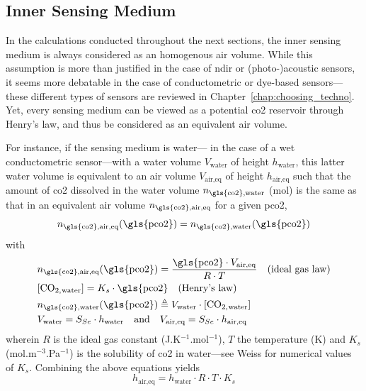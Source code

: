 \subsection{Inner Sensing Medium}\label{sect:tcco2:inner_medium}

In the calculations conducted throughout the next sections, the inner sensing medium is always considered as an homogenous air volume. While this assumption is more than justified in the case of \gls{ndir} or (photo-)acoustic sensors, it seems more debatable in the case of conductometric or dye-based sensors---these different types of sensors are reviewed in Chapter~\ref{chap:choosing_techno}. Yet, every sensing medium can be viewed as a potential \gls{co2} reservoir through Henry's law, and thus be considered as an equivalent air volume.

For instance, if the sensing medium is water---\eg{} in the case of a wet conductometric sensor---with a water volume $V_\text{water}$ of height $h_\text{water}$, this latter water volume is equivalent to an air volume $V_\text{air,eq}$ of height $h_\text{air,eq}$ such that the amount of \gls{co2} dissolved in the water volume $n_\text{\gls{co2},water}$ (mol) is the same as that in an equivalent air volume $n_\text{\gls{co2},air,eq}$ for a given \gls{pco2}, \ie{}
\begin{equation}
	n_\text{\gls{co2},air,eq}(\text{\gls{pco2}}) = n_\text{\gls{co2},water}(\text{\gls{pco2}})
\end{equation}
with
\begin{equation}
	\begin{aligned}
		&n_\text{\gls{co2},air,eq}(\text{\gls{pco2}}) = \frac{\text{\gls{pco2}} \cdot V_\text{air,eq}}{R\cdot T} \quad \text{(ideal gas law)}\\
		&\ce{[CO_{2,water}]} = K_s \cdot \text{\gls{pco2}} \quad \text{(Henry's law)}\\
		&n_\text{\gls{co2},water}(\text{\gls{pco2}}) \triangleq V_\text{water} \cdot \ce{[CO_{2,water}]}\\
		&V_\text{water} = S_{Se} \cdot h_\text{water} \quad \text{and} \quad V_\text{air,eq} = S_{Se} \cdot h_\text{air,eq}\\
	\end{aligned}
\end{equation}
wherein $R$ is the ideal gas constant (J.K$^{-1}$.mol$^{-1}$), $T$ the temperature (K) and $K_s$ (mol.m$^{-3}$.Pa$^{-1}$) is the solubility of \gls{co2} in water---see \eg{} Weiss\cite{weiss1974} for numerical values of $K_s$. Combining the above equations yields
\begin{equation}
	h_\text{air,eq} = h_\text{water} \cdot R \cdot T \cdot K_s
\end{equation}

